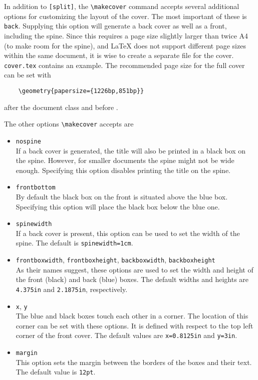 In addition to \texttt{[split]}, the \verb|\makecover| command accepts several additional options for customizing the layout of the cover. 
The most important of these is \texttt{back}. Supplying this option will generate a back cover as well as a front, including the spine. Since this requires a page size slightly larger than twice A4 (to make room for the spine), and \LaTeX{} does not support different page sizes within the same document, it is wise to create a separate file for the cover. \texttt{cover.tex} contains an example. The recommended page size for the full cover can be set with
\begin{verbatim}
    \geometry{papersize={1226bp,851bp}}
\end{verbatim}
after the document class and before \verb||.

The other options \verb|\makecover| accepts are
\begin{itemize}
\item\texttt{nospine} \\
    If a back cover is generated, the title will also be printed in a black box on the spine. However, for smaller documents the spine might not be wide enough. Specifying this option disables printing the title on the spine.
\item\texttt{frontbottom} \\
    By default the black box on the front is situated above the blue box. Specifying this option will place the black box below the blue one.
\item\texttt{spinewidth} \\
    If a back cover is present, this option can be used to set the width of the spine. The default is \texttt{spinewidth=1cm}.
\item\texttt{frontboxwidth}, \texttt{frontboxheight}, \texttt{backboxwidth}, \texttt{backboxheight} \\
    As their names suggest, these options are used to set the width and height of the front (black) and back (blue) boxes. The default widths and heights are \texttt{4.375in} and \texttt{2.1875in}, respectively.
\item\texttt{x}, \texttt{y} \\
    The blue and black boxes touch each other in a corner. The location of this corner can be set with these options. It is defined with respect to the top left corner of the front cover. The default values are \texttt{x=0.8125in} and \texttt{y=3in}.
\item\texttt{margin} \\
    This option sets the margin between the borders of the boxes and their text. The default value is \texttt{12pt}.
\end{itemize}

